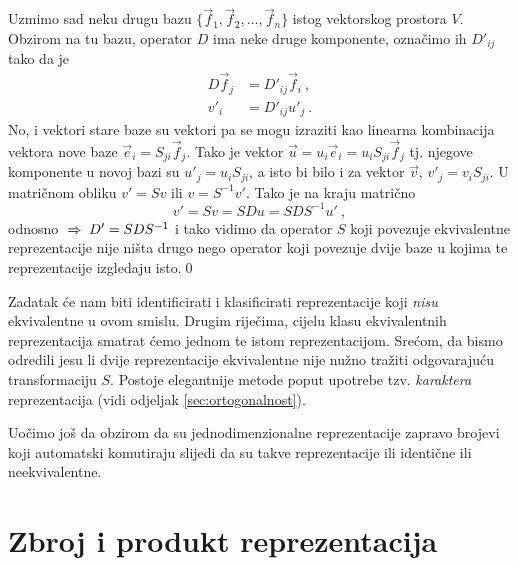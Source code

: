 Uzmimo sad neku drugu bazu $\{\vec{f}_1, \vec{f}_2, \ldots, \vec{f}_n\}$
istog vektorskog prostora $V$.
Obzirom na tu bazu, operator $D$ ima neke druge komponente, označimo ih
$D'_{ij}$ tako da je
\begin{align}
    D \vec{f}_j& = D'_{ij} \vec{f}_i  \:, \\
    v'_i& = D'_{ij} u'_j \:.
\end{align}
No, i vektori stare baze su vektori pa se mogu izraziti kao linearna
kombinacija vektora nove baze $\vec{e}_i = S_{ji} \vec{f}_j$.
Tako je vektor $\vec{u}=u_i \vec{e}_i = u_i S_{ji} \vec{f}_j$ tj.
njegove komponente u novoj bazi su
$u'_j = u_i S_{ji}$, a isto bi bilo i za vektor $\vec{v}$,  $v'_j = v_i S_{ji}$.
U matričnom obliku $v'=Sv$ ili  $v=S^{-1}v'$.
Tako je na kraju matrično
\begin{equation}
v'=Sv=SDu=SDS^{-1}u' \:,
\end{equation}
odnosno $\;\Rightarrow\; D'=SDS^{-1}$ i tako vidimo da operator $S$ koji povezuje
ekvivalentne reprezentacije nije ništa drugo nego operator koji povezuje
dvije baze u kojima te reprezentacije izgledaju isto.\qed

Zadatak će nam biti identificirati i klasificirati reprezentacije koji
\emph{nisu} ekvivalentne u ovom smislu. Drugim riječima, cijelu klasu
ekvivalentnih reprezentacija smatrat ćemo jednom te istom reprezentacijom.
Srećom, da bismo odredili jesu li dvije reprezentacije ekvivalentne
nije nužno tražiti odgovarajuću transformaciju $S$. Postoje elegantnije metode
poput upotrebe tzv. \emph{karaktera} reprezentacija
(vidi odjeljak \ref{sec:ortogonalnost}).

Uočimo još da obzirom da su jednodimenzionalne reprezentacije zapravo brojevi koji
automatski komutiraju slijedi da su takve reprezentacije ili identične ili
neekvivalentne.


\section{Zbroj i produkt reprezentacija}

